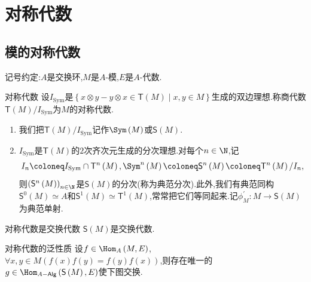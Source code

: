 \chapter{对称代数}

\section{模的对称代数}

记号约定:$A$是交换环,$M$是$A$-模,$E$是$A$-代数.

\begin{definition}{对称代数}{}
	设$I_{\text{Sym}}$是$\left\{x\otimes y-y\otimes x\in\mathsf{T}\left(M\right)\middle|x,y\in M\right\}$生成的双边理想.称商代数$\mathsf{T}\left(M\right)/I_{\text{Sym}}$为$M$的对称代数.
\end{definition}

\begin{remark}{}{}
	\begin{enumerate}
		\item 我们把$\mathsf{T}\left(M\right)/I_{\text{Sym}}$记作$\Sym\left(M\right)$或$\mathsf{S}\left(M\right)$.
		\item $I_{\text{Sym}}$是$\mathsf{T}\left(M\right)$的$2$次齐次元生成的分次理想.对每个$n\in\N$,记
		\begin{align*}
			I_{n}\coloneq I_{\text{Sym}}\cap\mathsf{T}^{n}\left(M\right),\Sym^{n}\left(M\right)\coloneq\mathsf{S}^{n}\left(M\right)\coloneq\mathsf{T}^{n}\left(M\right)/I_{n},
		\end{align*}
		则$\left(\mathsf{S}^{n}\left(M\right)\right)_{n\in\N}$是$\mathsf{S}\left(M\right)$的分次(称为典范分次).此外,我们有典范同构$\mathsf{S}^{0}\left(M\right)\simeq A$和$\mathsf{S}^{1}\left(M\right)\simeq\mathsf{T}^{1}\left(M\right)$,常常把它们等同起来.记$\phi_{M}^{\prime}:M\to\mathsf{S}\left(M\right)$为典范单射.
	\end{enumerate}
\end{remark}

\begin{proposition}{对称代数是交换代数}{}
	$\mathsf{S}\left(M\right)$是交换代数.
\end{proposition}

\begin{proposition}{对称代数的泛性质}{}
	设$f\in\Hom_{A}\left(M,E\right)$,$\forall x,y\in M\left(f\left(x\right)f\left(y\right)=f\left(y\right)f\left(x\right)\right)$,则存在唯一的$g\in\Hom_{A-\mathsf{Alg}}\left(\mathsf{S}\left(M\right),E\right)$使下图交换.
	\begin{center}
	\end{center}
\end{proposition}

